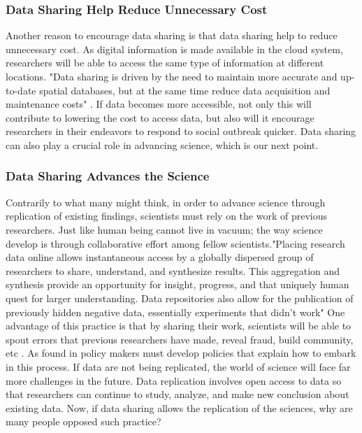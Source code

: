 \documentclass[sigconf]{acmart}
\begin{document}
\subsubsection{Data Sharing Help Reduce Unnecessary Cost
}

Another reason to encourage data sharing is that data sharing help to reduce unnecessary cost. As digital information is made available in the cloud system, researchers will be able to access the same type of information at different locations.  "Data sharing is driven by the need to maintain more accurate and up-to-date spatial databases, but at the same time reduce data acquisition and maintenance costs" \cite{stoakes2005data}. If data becomes more accessible, not only this will contribute to lowering the cost to access data, but also will it encourage researchers in their endeavors to respond to social outbreak quicker. Data sharing can also play a crucial role in advancing science, which is our next point. 

\subsubsection*{Data Sharing Advances the Science}

Contrarily to what many might think, in order to advance science through replication of existing findings, scientists must rely on the work of previous researchers. Just like human being cannot live in vacuum; the way science develop is through collaborative effort among fellow scientists."Placing research data online allows instantaneous access by a globally dispersed group of researchers to share, understand, and synthesize results. This aggregation and synthesis provide an opportunity for insight, progress, and that uniquely human quest for larger understanding. Data repositories also allow for the publication of previously hidden negative data, essentially experiments that didn't work" \cite{Uswyshyn2016}  One advantage of this practice is that by sharing their work, scientists will be able to spout errors that previous researchers have made, reveal fraud, build community, etc \cite{leetaru2016}. As found in \cite{borgman2012conundrum} policy makers must develop policies that explain how to embark in this process. If data are not being replicated, the world of science will face far more challenges in the future. Data replication involves open access to data so that researchers can continue to study, analyze, and make new conclusion about existing data. Now, if data sharing allows the replication of the sciences, why are many people opposed such practice? 
\end{document}
